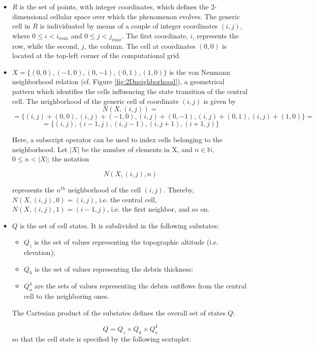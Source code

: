 \begin{itemize}

\item $R$ is the set of points, with integer coordinates, which
  defines the 2-dimensional cellular space over which the phenomenon
  evolves. The generic cell in $R$ is individuated by means of a
  couple of integer coordinates $(i, j)$, where $0 \leq i < i_{max}$
  and $0 \leq j < j_{max}$. The first coordinate, $i$, represents the
  row, while the second, $j$, the column. The cell at coordinates
  $(0,0)$ is located at the top-left corner of the computational grid.

\item $X = \{(0,0), (-1, 0), (0, -1), (0, 1), (1, 0)\}$ is the von
  Neumann neighborhood relation (cf. Figure \ref{fig:2Dneighborhood}), a
  geometrical pattern which identifies the cells influencing the state
  transition of the central cell. The neighborhood of the generic cell
  of coordinate $(i, j)$ is given by
$$N(X, (i, j)) =$$
$$= \{(i, j)+(0,0), (i, j)+(-1, 0), (i, j)+(0, -1),
(i, j)+(0, 1), (i, j)+(1, 0)\} =$$
$$= \{(i, j), (i-1, j), (i, j-1), (i, j+1), (i+1, j)\}$$

Here, a subscript operator can be used to index cells belonging to the
neighborhood. Let $|X|$ be the number of elements in X, and $n \in
\mathbb{N}$, $0 \leq n < |X|$; the notation

$$N(X, (i, j), n)$$

represents the $n^{th}$ neighborhood of the cell $(i,j)$. Thereby, $N(X, (i, j), 0) = (i, j)$, i.e. the central cell, $N(X, (i, j), 1) = (i-1, j)$, i.e. the first neighbor, and so on.

\item $Q$ is the set of cell states. It is subdivided in the following
  substates:

\begin{itemize}
    \item   $Q_z$ is the set of values representing the topographic altitude (i.e. elevation);
    \item   $Q_h$ is the set of values representing the debris thickness;
    \item   $Q_o^4$ are the sets of values representing the debris outflows from the central cell to the neighboring ones.
\end{itemize}

The Cartesian product of the substates defines the overall set of
states $Q$:

$$Q = Q_z \times Q_h \times Q_o^4$$
so that the cell state is specified by the following sextuplet:


\end{itemize}
